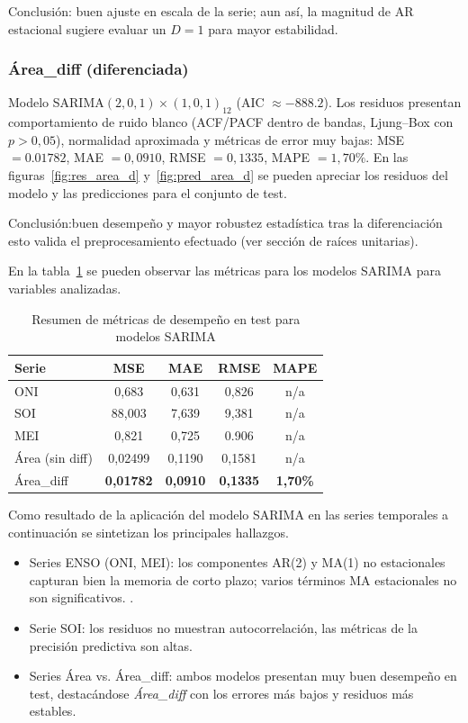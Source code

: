 Conclusión: buen ajuste en escala de la serie; aun así, la magnitud de AR estacional sugiere evaluar un $D=1$ para mayor estabilidad.
\vspace{0.3em}


\subsubsection{Área\_diff (diferenciada)}
Modelo SARIMA$(2,0,1)\times(1,0,1)_{12}$
(AIC $\approx -888.2$). Los residuos presentan comportamiento de ruido blanco (ACF/PACF dentro
de bandas, Ljung--Box con $p>0,05$), normalidad aproximada y métricas de error muy bajas:
MSE $=0.01782$, MAE $=0,0910$, RMSE $=0,1335$, MAPE $=1,70\%$. En las figuras~\ref{fig:res_area_d} y~\ref{fig:pred_area_d} se pueden apreciar los residuos del modelo y las predicciones para el conjunto de test.

Conclusión:buen desempeño y mayor robustez estadística tras la diferenciación esto valida el preprocesamiento efectuado (ver sección de raíces unitarias).


En la tabla~\ref{tab:metricas_sarima} se pueden observar las métricas para los modelos SARIMA para variables analizadas. 

\begin{table}[H]
\centering
\caption{Resumen de métricas de desempeño en test para modelos SARIMA}
\label{tab:metricas_sarima}
\begin{tabular}{lcccc}
\toprule
\textbf{Serie} & \textbf{MSE} & \textbf{MAE} & \textbf{RMSE} & \textbf{MAPE} \\
\midrule
ONI  & 0,683  & 0,631  & 0,826  & n/a \\
SOI  & 88,003 & 7,639  & 9,381  & n/a \\
MEI  & 0,821  & 0,725  & 0.906  & n/a \\
Área (sin diff) & 0,02499 & 0,1190 & 0,1581 & n/a \\
Área\_diff      & \textbf{0,01782} & \textbf{0,0910} & \textbf{0,1335} & \textbf{1,70\%} \\
\bottomrule
\end{tabular}
\end{table}

Como resultado de la aplicación del modelo SARIMA en las series temporales a continuación se sintetizan los principales hallazgos.

\begin{itemize}
    \item Series ENSO (ONI, MEI): los componentes AR(2) y MA(1) no estacionales
    capturan bien la memoria de corto plazo; varios términos MA estacionales no son
    significativos. .
    \item Serie SOI: los residuos no muestran autocorrelación, las métricas de la precisión predictiva son altas.
    \item Series Área vs. Área\_diff: ambos modelos presentan muy buen desempeño en test,
    destacándose \emph{Área\_diff} con los errores más bajos y residuos más
    estables.
\end{itemize}

